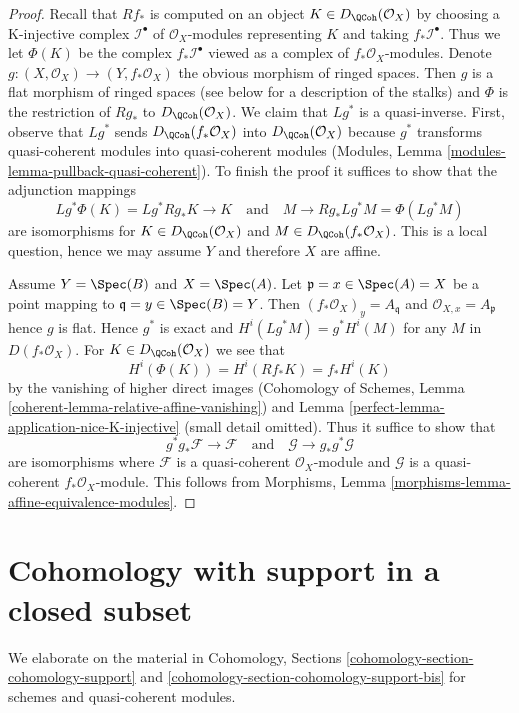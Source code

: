 \begin{proof}

Recall that $Rf_*$ is computed on an object $K \in D_\QCoh(\mathcal{O}_X)$
by choosing a K-injective complex $\mathcal{I}^\bullet$ of
$\mathcal{O}_X$-modules representing $K$ and taking $f_*\mathcal{I}^\bullet$.
Thus we let $\Phi(K)$ be the complex $f_*\mathcal{I}^\bullet$
viewed as a complex of $f_*\mathcal{O}_X$-modules.
Denote $g : (X, \mathcal{O}_X) \to (Y, f_*\mathcal{O}_X)$ the
obvious morphism of ringed spaces. Then $g$ is a flat morphism of
ringed spaces (see below for a description of the stalks) and
$\Phi$ is the restriction of $Rg_*$ to $D_\QCoh(\mathcal{O}_X)$.
We claim that $Lg^*$ is a quasi-inverse. First, observe that
$Lg^*$ sends $D_\QCoh(f_*\mathcal{O}_X)$ into $D_\QCoh(\mathcal{O}_X)$
because $g^*$ transforms quasi-coherent modules into quasi-coherent
modules (Modules, Lemma \ref{modules-lemma-pullback-quasi-coherent}).
To finish the proof it suffices to show that
the adjunction mappings
$$
Lg^*\Phi(K) = Lg^*Rg_*K \to K
\quad\text{and}\quad
M \to Rg_*Lg^*M = \Phi(Lg^*M)
$$
are isomorphisms for $K \in D_\QCoh(\mathcal{O}_X)$ and
$M \in D_\QCoh(f_*\mathcal{O}_X)$. This is a local question, hence
we may assume $Y$ and therefore $X$ are affine.

\medskip\noindent
Assume $Y = \Spec(B)$ and $X = \Spec(A)$. Let
$\mathfrak p = x \in \Spec(A) = X$ be a point mapping to
$\mathfrak q = y \in \Spec(B) = Y$. Then
$(f_*\mathcal{O}_X)_y = A_\mathfrak q$ and $\mathcal{O}_{X, x} = A_\mathfrak p$
hence $g$ is flat. Hence $g^*$ is exact and $H^i(Lg^*M) = g^*H^i(M)$
for any $M$ in $D(f_*\mathcal{O}_X)$.
For $K \in D_\QCoh(\mathcal{O}_X)$ we see that
$$
H^i(\Phi(K)) = H^i(Rf_*K) = f_*H^i(K)
$$
by the vanishing of higher direct images
(Cohomology of Schemes, Lemma \ref{coherent-lemma-relative-affine-vanishing})
and Lemma \ref{perfect-lemma-application-nice-K-injective} (small detail omitted).
Thus it suffice to show that
$$
g^*g_*\mathcal{F} \to \mathcal{F}
\quad\text{and}\quad
\mathcal{G} \to g_*g^*\mathcal{G}
$$
are isomorphisms where $\mathcal{F}$ is
a quasi-coherent $\mathcal{O}_X$-module and $\mathcal{G}$ is
a quasi-coherent $f_*\mathcal{O}_X$-module. This follows from
Morphisms, Lemma \ref{morphisms-lemma-affine-equivalence-modules}.
\end{proof}

\section{Cohomology with support in a closed subset}
\label{perfect-section-cohomology-support}
We elaborate on the material in Cohomology, Sections
\ref{cohomology-section-cohomology-support} and
\ref{cohomology-section-cohomology-support-bis} for schemes
and quasi-coherent modules.

